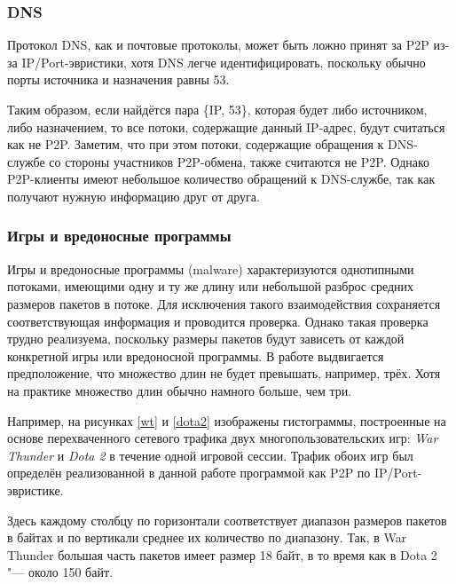 \documentclass[bachelor, och, coursework]{SCWorks}
\begin{document}
\subsubsection{DNS}
Протокол DNS, как и почтовые протоколы, может быть ложно принят за P2P из-за IP/Port-эвристики, хотя DNS легче идентифицировать, поскольку обычно порты источника и назначения равны 53. 

Таким образом, если найдётся пара \{IP, 53\}, которая будет либо источником, либо назначением, то все потоки, содержащие данный IP-адрес, будут считаться как не P2P. Заметим, что при этом потоки,
содержащие обращения к DNS-службе со стороны участников P2P-обмена, также считаются
не P2P. Однако P2P-клиенты имеют небольшое количество обращений к DNS-службе, так
как получают нужную информацию друг от друга.

\subsubsection{Игры и вредоносные программы}
Игры и вредоносные программы (malware) характеризуются однотипными потоками,
имеющими одну и ту же длину или небольшой разброс средних размеров пакетов в потоке. Для исключения такого взаимодействия сохраняется соответствующая информация и проводится проверка. Однако такая проверка трудно реализуема, поскольку размеры пакетов будут зависеть от каждой конкретной игры или вредоносной программы. В работе \cite{algorithm} выдвигается предположение, что множество длин не будет превышать, например, трёх. Хотя на практике множество длин обычно намного больше, чем три. 

Например, на рисунках \ref{wt} и \ref{dota2} изображены гистограммы, построенные на основе перехваченного сетевого трафика двух многопользовательских игр: \textit{War Thunder} и \textit{Dota 2} в течение одной игровой сессии. Трафик обоих игр был определён реализованной в данной работе программой как P2P по IP/Port-эвристике. 

Здесь каждому столбцу по горизонтали соответствует диапазон размеров пакетов в байтах и по вертикали среднее их количество по диапазону. Так, в War Thunder большая часть пакетов имеет размер 18 байт, в то время как в Dota 2 "--- около 150 байт. 
\end{document}
